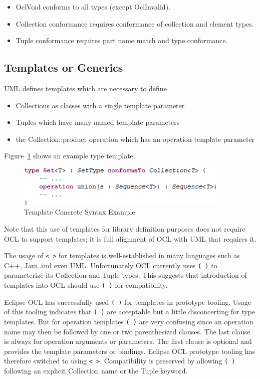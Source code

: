 \documentclass{eceasst}
\begin{document}
\begin{itemize}
\item OclVoid conforms to all types (except OclInvalid).
\item Collection conformance requires conformance of collection and element types.
\item Tuple conformance requires part name match and type conformance.
\end{itemize}

\subsection{Templates or Generics}

UML defines templates which are necessary to define
\begin{itemize}
\item Collections as classes with a single template parameter
\item Tuples which have many named template parameters
\item the Collection::product operation which has an operation template parameter
\end{itemize}

Figure~\ref{fig:TemplateExample} shows an example type template.

\begin{figure}
  \begin{center}
    \includegraphics[width=4.0in]{TemplateExample.png}
  \end{center}
  \caption{Template Concrete Syntax Example.}
  \label{fig:TemplateExample}
\end{figure}

Note that this use of templates for library definition purposes does not require OCL to support templates; it is full alignment of OCL with UML that requires it.

The usage of \verb|< >| for templates is well-established in many languages such as C++, Java and even UML. Unfortunately OCL currently uses \verb|( )| to parameterize its Collection and Tuple types. This suggests that introduction of templates into OCL should use \verb|( )| for compatibility.

Eclipse OCL has successfully used \verb|( )| for templates in prototype tooling. Usage of this tooling indicates that \verb|( )| are acceptable but a little disconcerting for type templates. But for operation templates \verb|( )| are very confusing since an operation name may then be followed by one or two parenthesized clauses. The last clause is always for operation arguments or parameters. The first clause is optional and provides the template parameters or bindings. Eclipse OCL prototype tooling has therefore switched to using \verb|< >|. Compatibility is preserved by allowing \verb|( )| following an explicit Collection name or the Tuple keyword.
\end{document}
